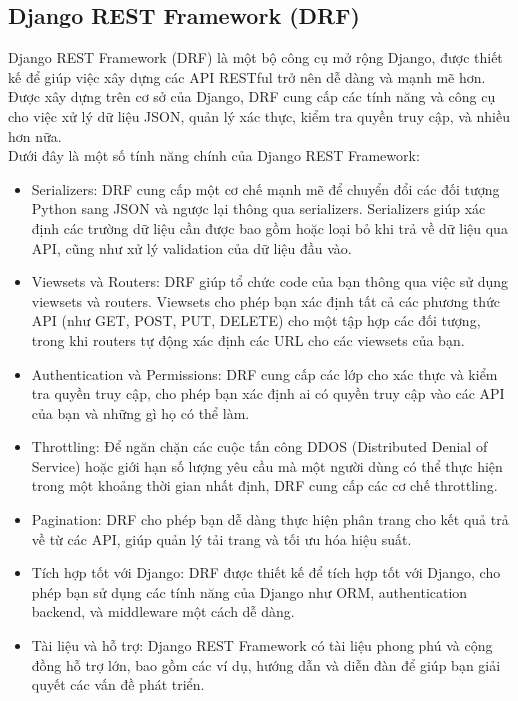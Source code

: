 \documentclass[a4paper]{article}
\begin{document}
\subsection{Django REST Framework (DRF)}
Django REST Framework (DRF) là một bộ công cụ mở rộng Django, được thiết kế để giúp việc xây dựng các API RESTful trở nên dễ dàng và mạnh mẽ hơn. Được xây dựng trên cơ sở của Django, DRF cung cấp các tính năng và công cụ cho việc xử lý dữ liệu JSON, quản lý xác thực, kiểm tra quyền truy cập, và nhiều hơn nữa. \\
Dưới đây là một số tính năng chính của Django REST Framework:\\
\begin{itemize}
    \item Serializers: DRF cung cấp một cơ chế mạnh mẽ để chuyển đổi các đối tượng Python sang JSON và ngược lại thông qua serializers. Serializers giúp xác định các trường dữ liệu cần được bao gồm hoặc loại bỏ khi trả về dữ liệu qua API, cũng như xử lý validation của dữ liệu đầu vào.
    \item Viewsets và Routers: DRF giúp tổ chức code của bạn thông qua việc sử dụng viewsets và routers. Viewsets cho phép bạn xác định tất cả các phương thức API (như GET, POST, PUT, DELETE) cho một tập hợp các đối tượng, trong khi routers tự động xác định các URL cho các viewsets của bạn.
    \item Authentication và Permissions: DRF cung cấp các lớp cho xác thực và kiểm tra quyền truy cập, cho phép bạn xác định ai có quyền truy cập vào các API của bạn và những gì họ có thể làm.
    \item Throttling: Để ngăn chặn các cuộc tấn công DDOS (Distributed Denial of Service) hoặc giới hạn số lượng yêu cầu mà một người dùng có thể thực hiện trong một khoảng thời gian nhất định, DRF cung cấp các cơ chế throttling.
    \item Pagination: DRF cho phép bạn dễ dàng thực hiện phân trang cho kết quả trả về từ các API, giúp quản lý tải trang và tối ưu hóa hiệu suất.
    \item Tích hợp tốt với Django: DRF được thiết kế để tích hợp tốt với Django, cho phép bạn sử dụng các tính năng của Django như ORM, authentication backend, và middleware một cách dễ dàng.
   \item  Tài liệu và hỗ trợ: Django REST Framework có tài liệu phong phú và cộng đồng hỗ trợ lớn, bao gồm các ví dụ, hướng dẫn và diễn đàn để giúp bạn giải quyết các vấn đề phát triển.
\end{itemize}
\end{document}
